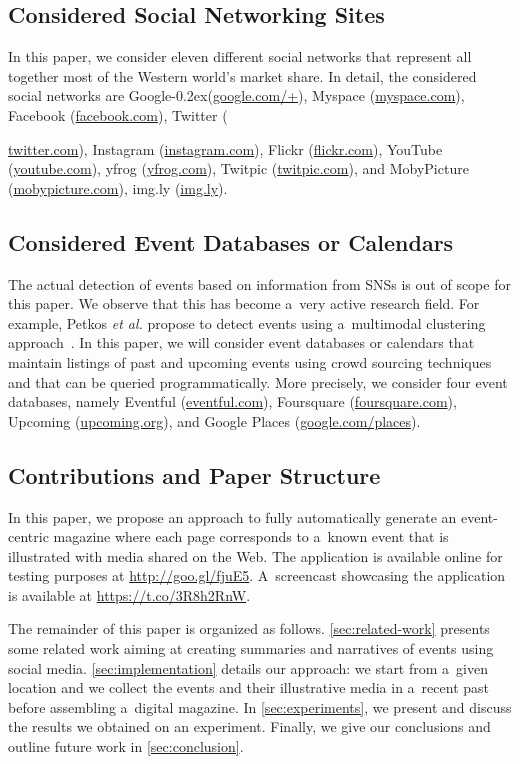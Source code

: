 \documentclass[runningheads,a4paper]{llncs}
\newcommand{\googleplus}{Google\nolinebreak\hspace{0em}\raisebox{.28ex}{\tiny\bf +}\kern-0.2ex\xspace}
\begin{document}
\subsection{Considered Social Networking Sites}
In this paper, we consider eleven different social networks that represent all together most of the Western world's market share. In detail, the considered social networks are
\googleplus (\url{google.com/+}),
Myspace (\url{myspace.com}),
Facebook (\url{facebook.com}),
Twitter ({\url{twitter.com}),
Instagram (\url{instagram.com}),
Flickr (\url{flickr.com}),
YouTube (\url{youtube.com}),
yfrog (\url{yfrog.com}),
Twitpic (\url{twitpic.com}), and
MobyPicture (\url{mobypicture.com}),
\mbox{img.ly} (\url{img.ly}).

\subsection{Considered Event Databases or Calendars}
The actual detection of events based on information from SNSs is out of scope for this paper. We observe that this has become a~very active research field. For example, Petkos \emph{et al.} propose to detect events using a~multimodal clustering approach~\cite{Petkos2012}. In this paper, we will consider event databases or calendars that maintain listings of past and upcoming events using crowd sourcing techniques and that can be queried programmatically. More precisely, we consider four event databases, namely Eventful (\url{eventful.com}), Foursquare (\url{foursquare.com}), Upcoming (\url{upcoming.org}), and Google Places (\url{google.com/places}).

\subsection{Contributions and Paper Structure}
In this paper, we propose an approach to fully automatically generate an event-centric magazine where each page corresponds to a~known event that is illustrated with media shared on the Web.
The application is available online for testing purposes at \url{http://goo.gl/fjuE5}. A~screencast showcasing the application is available at \url{https://t.co/3R8h2RnW}.

The remainder of this paper is organized as follows. \autoref{sec:related-work} presents some related work aiming at creating summaries and narratives of events using social media. \autoref{sec:implementation} details our approach: we start from a~given location and we collect the events and their illustrative media in a~recent past before assembling a~digital magazine. In \autoref{sec:experiments}, we present and discuss the results we obtained on an experiment. Finally, we give our conclusions and outline future work in \autoref{sec:conclusion}.

}
\end{document}

